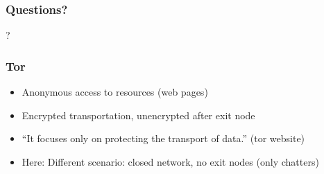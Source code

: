\documentclass{beamer}
\begin{document}


\frame
{
  \frametitle{Questions?}
  \begin{center}
  ?
  \end{center}
}

\frame
{
  \frametitle{Tor}
  \begin{itemize}
    \item Anonymous access to resources (web pages)
    \item Encrypted transportation, unencrypted after exit node
    \item "`It focuses only on protecting the transport of data."' (tor website)
    \item Here: Different scenario: closed network, no exit nodes (only chatters)
  \end{itemize}
}
\end{document}
